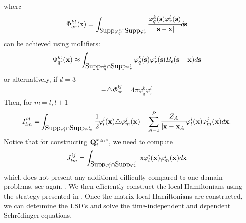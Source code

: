 where 
\begin{eqnarray*}
\Phi_{qr}^{kl}({\bf x}) = \int_{\hbox{Supp}\varphi^k_q\cap \hbox{Supp}\varphi^l_r}\cfrac{\varphi_q^k({\bf s})\varphi_r^l({\bf s})}{|{\bf s}-{\bf x}|}d{\bf s}
\end{eqnarray*} 
can be achieved using mollifiers:
\begin{eqnarray*}
\Phi_{qr}^{kl}({\bf x}) \approx \int_{\hbox{Supp}\varphi^k_q\cap \hbox{Supp}\varphi^l_r}\varphi_q^k({\bf s})\varphi_r^l({\bf s})B_{\epsilon}({\bf s}-{\bf x})d{\bf s}
\end{eqnarray*} 
or alternatively, if $d=3$
\begin{eqnarray*}
-\triangle \Phi_{qr}^{kl} = 4\pi\varphi_q^k\varphi_r^l
\end{eqnarray*}
Then, for $m=l,l\pm 1$
\begin{eqnarray*}
I_{lm}^{ij} = \int_{\hbox{Supp}\varphi^i_l\cap \hbox{Supp}\varphi_m^j}\cfrac{1}{2}\varphi_l^i({\bf x})\triangle\varphi_m^j({\bf x})-\sum_{A=1}^P\cfrac{Z_A}{|{\bf x}-{\bf x}_A|}\varphi_l^i({\bf x})\varphi_m^j({\bf x})d{\bf x}.
\end{eqnarray*} 
Notice that for constructing  ${\bf Q}_i^{x,y,z}$, we need to compute
\begin{eqnarray*}
J^{ij}_{lm} = \int_{\hbox{Supp}\varphi^i_l\cap \hbox{Supp}\varphi_m^j}{\bf x}\varphi_l^i({\bf x})\varphi_m^{j}({\bf x})d{\bf x}%
\end{eqnarray*}
which does not present any additional difficulty compared to one-domain problems, see again \cite{CAM15-09}.  We then efficiently construct the local Hamiltonians using the strategy presented in \cite{CAM15-10}. Once the matrix local Hamiltonians are constructed, we can determine the LSD's and solve the time-independent and dependent Schr\"odinger equations.
